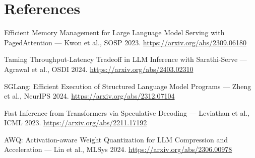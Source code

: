 \documentclass[11pt,a4paper]{article}
\begin{document}
\section*{References}
\begin{enumerate}[label={[\arabic*]},leftmargin=2em]
\item Efficient Memory Management for Large Language Model Serving with PagedAttention --- Kwon et al., SOSP 2023. \url{https://arxiv.org/abs/2309.06180}
\item Taming Throughput-Latency Tradeoff in LLM Inference with Sarathi-Serve --- Agrawal et al., OSDI 2024. \url{https://arxiv.org/abs/2403.02310}
\item SGLang: Efficient Execution of Structured Language Model Programs --- Zheng et al., NeurIPS 2024. \url{https://arxiv.org/abs/2312.07104}
\item Fast Inference from Transformers via Speculative Decoding --- Leviathan et al., ICML 2023. \url{https://arxiv.org/abs/2211.17192}
\item AWQ: Activation-aware Weight Quantization for LLM Compression and Acceleration --- Lin et al., MLSys 2024. \url{https://arxiv.org/abs/2306.00978}
\end{enumerate}
\end{document}
